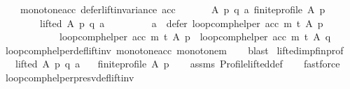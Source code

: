 \begin{isabellebody}
\ \ \ \ monotone{\isacharunderscore}{\kern0pt}acc{\isacharcolon}{\kern0pt}\ {\isachardoublequoteopen}defer{\isacharunderscore}{\kern0pt}lift{\isacharunderscore}{\kern0pt}invariance\ acc{\isachardoublequoteclose}\isanewline
\ \ \isanewline
\ \ \ \ {\isachardoublequoteopen}{\isasymforall}A\ p\ q\ a{\isachardot}{\kern0pt}\ {\isacharparenleft}{\kern0pt}finite{\isacharunderscore}{\kern0pt}profile\ A\ p\ {\isasymand}\isanewline
\ \ \ \ \ \ \ \ lifted\ A\ p\ q\ a\ {\isasymand}\isanewline
\ \ \ \ \ \ \ \ a\ {\isasymin}\ {\isacharparenleft}{\kern0pt}defer\ {\isacharparenleft}{\kern0pt}loop{\isacharunderscore}{\kern0pt}comp{\isacharunderscore}{\kern0pt}helper\ acc\ m\ t{\isacharparenright}{\kern0pt}\ A\ p{\isacharparenright}{\kern0pt}{\isacharparenright}{\kern0pt}\ {\isasymlongrightarrow}\isanewline
\ \ \ \ \ \ \ \ \ \ \ \ {\isacharparenleft}{\kern0pt}loop{\isacharunderscore}{\kern0pt}comp{\isacharunderscore}{\kern0pt}helper\ acc\ m\ t{\isacharparenright}{\kern0pt}\ A\ p\ {\isacharequal}{\kern0pt}\ {\isacharparenleft}{\kern0pt}loop{\isacharunderscore}{\kern0pt}comp{\isacharunderscore}{\kern0pt}helper\ acc\ m\ t{\isacharparenright}{\kern0pt}\ A\ q{\isachardoublequoteclose}\isanewline
%
\isadelimproof
\ \ %
\endisadelimproof
%
\isatagproof
{}\isamarkupfalse%
\ loop{\isacharunderscore}{\kern0pt}comp{\isacharunderscore}{\kern0pt}helper{\isacharunderscore}{\kern0pt}def{\isacharunderscore}{\kern0pt}lift{\isacharunderscore}{\kern0pt}inv\ monotone{\isacharunderscore}{\kern0pt}acc\ monotone{\isacharunderscore}{\kern0pt}m\isanewline
\ \ \isamarkupfalse%
\ blast%
\endisatagproof
{\isafoldproof}%
%
\isadelimproof
\isanewline
%
\endisadelimproof
\isanewline
{}\isamarkupfalse%
\ lifted{\isacharunderscore}{\kern0pt}imp{\isacharunderscore}{\kern0pt}fin{\isacharunderscore}{\kern0pt}prof{\isacharcolon}{\kern0pt}\isanewline
\ \ \ {\isachardoublequoteopen}lifted\ A\ p\ q\ a{\isachardoublequoteclose}\isanewline
\ \ \ {\isachardoublequoteopen}finite{\isacharunderscore}{\kern0pt}profile\ A\ p{\isachardoublequoteclose}\isanewline
%
\isadelimproof
\ \ %
\endisadelimproof
%
\isatagproof
{}\isamarkupfalse%
\ assms\ Profile{\isachardot}{\kern0pt}lifted{\isacharunderscore}{\kern0pt}def\isanewline
\ \ \isamarkupfalse%
\ fastforce%
\endisatagproof
{\isafoldproof}%
%
\isadelimproof
\isanewline
%
\endisadelimproof
\isanewline
{}\isamarkupfalse%
\ loop{\isacharunderscore}{\kern0pt}comp{\isacharunderscore}{\kern0pt}helper{\isacharunderscore}{\kern0pt}presv{\isacharunderscore}{\kern0pt}def{\isacharunderscore}{\kern0pt}lift{\isacharunderscore}{\kern0pt}inv{\isacharcolon}{\kern0pt}\isanewline

\end{isabellebody}
